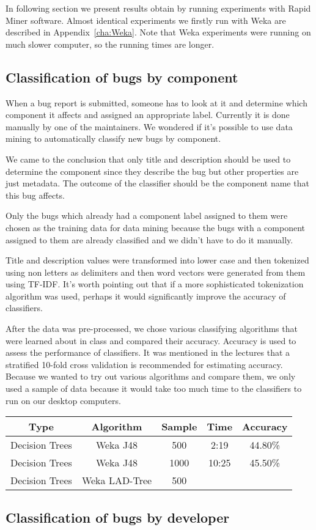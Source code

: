 In following section we present results obtain by running experiments with Rapid Miner software. Almost identical experiments we firstly run with Weka are described in Appendix~\ref{cha:Weka}. Note that Weka experiments were running on much slower computer, so the running times are longer. 

\subsection{Classification of bugs by component} %
\label{sub:Classification of bugs bugs by component}

When a bug report is submitted, someone has to look at it and determine which component it affects and assigned an appropriate label. Currently it is done manually by one of the maintainers. We wondered if it's possible to use data mining to automatically classify new bugs by component.

We came to the conclusion that only title and description should be used to determine the component since they describe the bug but other properties are just metadata. The outcome of the classifier should be the component name that this bug affects.

Only the bugs which already had a component label assigned to them were chosen as the training data for data mining because the bugs with a component assigned to them are already classified and we didn't have to do it manually.

Title and description values were transformed into lower case and then tokenized using non letters as delimiters and then word vectors were generated from them using TF-IDF. It's worth pointing out that if a more sophisticated tokenization algorithm was used, perhaps it would significantly improve the accuracy of classifiers.

After the data was pre-processed, we chose various classifying algorithms that were learned about in class and compared their accuracy. Accuracy is used to assess the performance of classifiers. It was mentioned in the lectures that a stratified 10-fold cross validation is recommended for estimating accuracy. Because we wanted to try out various algorithms and compare them, we only used a sample of data because it would take too much time to the classifiers to run on our desktop computers.

\begin{tabular}{|c|c|c|c|c|}
\hline
Type     &       Algorithm   & Sample &  Time &  Accuracy   \\
\hline
\hline
Decision Trees &  Weka J48    &  500  &   2:19 &    44.80\%  \\
Decision Trees & Weka J48    & 1000  &  10:25 &    45.50\%  \\
Decision Trees & Weka LAD-Tree &  500  &        &           \\
\hline
\end{tabular}


\subsection{Classification of bugs by developer} %
\label{sub:Classification of bugs bugs by developer}


